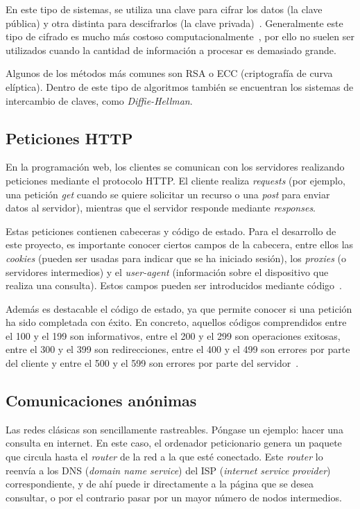 En este tipo de sistemas, se utiliza una clave para cifrar los datos (la clave pública) y otra distinta para descifrarlos (la clave privada)~\cite{cifradoIBM}. Generalmente este tipo de cifrado es mucho más costoso computacionalmente~\cite{apuntesCybersec}, por ello no suelen ser utilizados cuando la cantidad de información a procesar es demasiado grande. 

Algunos de los métodos más comunes son RSA o ECC (criptografía de curva elíptica). Dentro de este tipo de algoritmos también se encuentran los sistemas de intercambio de claves, como \textit{Diffie-Hellman}.

\subsection{Peticiones HTTP}

En la programación web, los clientes se comunican con los servidores realizando peticiones mediante el protocolo HTTP. El cliente realiza \textit{requests} (por ejemplo, una petición \textit{get} cuando se quiere solicitar un recurso o una \textit{post} para enviar datos al servidor), mientras que el servidor responde mediante \textit{responses}.

Estas peticiones contienen cabeceras y código de estado. Para el desarrollo de este proyecto, es importante conocer ciertos campos de la cabecera, entre ellos las \textit{cookies} (pueden ser usadas para indicar que se ha iniciado sesión), los \textit{proxies} (o servidores intermedios) y el \textit{user-agent} (información sobre el dispositivo que realiza una consulta). Estos campos pueden ser introducidos mediante código~\cite{httpHeaders}.

Además es destacable el código de estado, ya que permite conocer si una petición ha sido completada con éxito. En concreto, aquellos códigos comprendidos entre el 100 y el 199 son informativos, entre el 200 y el 299 son operaciones exitosas, entre el 300 y el 399 son redirecciones, entre el 400 y el 499 son errores por parte del cliente y entre el 500 y el 599 son errores por parte del servidor~\cite{httpStatus}.





\subsection{Comunicaciones anónimas}

Las redes clásicas son sencillamente rastreables. Póngase un ejemplo: hacer una consulta en internet. En este caso, el ordenador peticionario genera un paquete que circula hasta el \textit{router} de la red a la que esté conectado. Este \textit{router} lo reenvía a los DNS (\textit{domain name service}) del ISP (\textit{internet service provider}) correspondiente, y de ahí puede ir directamente a la página que se desea consultar, o por el contrario pasar por un mayor número de nodos intermedios.

